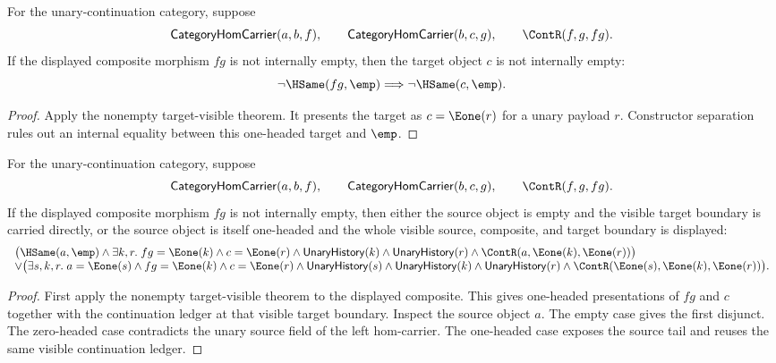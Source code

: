 \begin{theorem}
\label{thm:category-hom-carrier-comp-result-nonempty-target-not-empty}
For the unary-continuation category, suppose
$$
\mathsf{CategoryHomCarrier}(a,b,f),\qquad
\mathsf{CategoryHomCarrier}(b,c,g),\qquad
\ContR(f,g,fg).
$$
If the displayed composite morphism $fg$ is not internally empty, then the
target object $c$ is not internally empty:
$$
\neg\HSame(fg,\emp)\Longrightarrow \neg\HSame(c,\emp).
$$
\end{theorem}
\begin{proof}
Apply the nonempty target-visible theorem. It presents the target as
$c=\Eone(r)$ for a unary payload $r$. Constructor separation rules out an
internal equality between this one-headed target and $\emp$.
\end{proof}

\begin{theorem}
\label{thm:category-hom-carrier-comp-result-nonempty-source-target-cases}
For the unary-continuation category, suppose
$$
\mathsf{CategoryHomCarrier}(a,b,f),\qquad
\mathsf{CategoryHomCarrier}(b,c,g),\qquad
\ContR(f,g,fg).
$$
If the displayed composite morphism $fg$ is not internally empty, then either
the source object is empty and the visible target boundary is carried directly,
or the source object is itself one-headed and the whole visible source,
composite, and target boundary is displayed:
$$
\begin{array}{l}
\bigl(\HSame(a,\emp)\land
\exists k,r.\;fg=\Eone(k)\land c=\Eone(r)\land
\mathsf{UnaryHistory}(k)\land\mathsf{UnaryHistory}(r)\land
\ContR(a,\Eone(k),\Eone(r))\bigr)
\\
\vee
\bigl(\exists s,k,r.\;a=\Eone(s)\land fg=\Eone(k)\land c=\Eone(r)\land
\mathsf{UnaryHistory}(s)\land\mathsf{UnaryHistory}(k)\land
\mathsf{UnaryHistory}(r)\land
\ContR(\Eone(s),\Eone(k),\Eone(r))\bigr).
\end{array}
$$
\end{theorem}
\begin{proof}
First apply the nonempty target-visible theorem to the displayed composite.
This gives one-headed presentations of $fg$ and $c$ together with the
continuation ledger at that visible target boundary. Inspect the source object
$a$. The empty case gives the first disjunct. The zero-headed case contradicts
the unary source field of the left hom-carrier. The one-headed case exposes the
source tail and reuses the same visible continuation ledger.
\end{proof}

